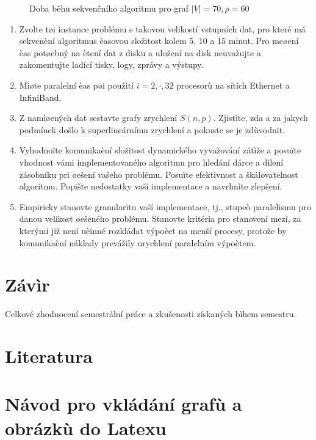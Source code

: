 \documentclass[12pt]{article}
\begin{document}
\begin{figure}[ht]
\epsfysize=9cm \centerline{} \caption{Doba běhu sekvenčního algoritmu pro graf $\vert V \vert = 70, \rho = 60$} \label{seq}
\end{figure}

\begin{enumerate}
\item Zvolte tøi instance problému s takovou velikostí vstupních dat, pro které má
sekvenèní algoritmus èasovou složitost kolem 5, 10 a 15 minut. Pro
meøení èas potøebný na ètení dat z disku a uložení na disk
neuvažujte a zakomentujte ladící tisky, logy, zprávy a výstupy.
\item Mìøte paralelní èas pøi použití $i=2,\cdot,32$ procesorù na sítích Ethernet a InfiniBand.
\item Z namìøených dat sestavte grafy zrychlení $S(n,p)$. Zjistìte, zda a za jakych podmínek
došlo k superlineárnímu zrychlení a pokuste se je zdùvodnit.
\item Vyhodnoïte komunikaèní složitost dynamického vyvažování zátìže a posuïte
vhodnost vámi implementovaného algoritmu pro hledání dárce a dìlení
zásobníku pri øešení vašeho problému. Posuïte efektivnost a
škálovatelnost algoritmu. Popište nedostatky vaší implementace a
navrhnìte zlepšení.
\item Empiricky stanovte
granularitu vaší implementace, tj., stupeò paralelismu pro danou
velikost øešeného problému. Stanovte kritéria pro stanovení mezí, za
kterými již není uèinné rozkládat výpoèet na menší procesy, protože
by komunikaèní náklady prevážily urychlení paralelním výpoètem.

\end{enumerate}

\section{Závìr}

Celkové zhodnocení semestrální práce a zkušenosti získaných bìhem
semestru.

\section{Literatura}

\appendix

\section{Návod pro vkládání grafù a obrázkù do Latexu}
\end{document}

